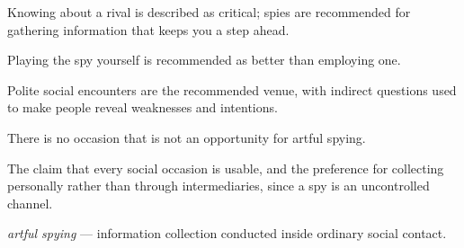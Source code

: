 

\begin{distilled}
  \item Knowing about a rival is described as critical; spies are recommended for gathering information that keeps you a step ahead.
  \item Playing the spy yourself is recommended as better than employing one.
  \item Polite social encounters are the recommended venue, with indirect questions used to make people reveal weaknesses and intentions.
  \item There is no occasion that is not an opportunity for artful spying.
\end{distilled}

\begin{unique}
  \item The claim that every social occasion is usable, and the preference for collecting personally rather than through intermediaries, since a spy is an uncontrolled channel.
\end{unique}

\begin{terms}
  \item \emph{artful spying} --- information collection conducted inside ordinary social contact.
\end{terms}
